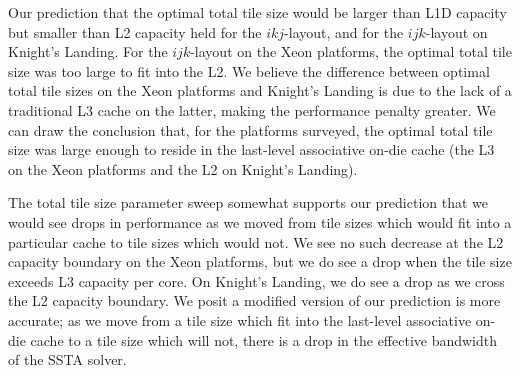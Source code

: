 \documentclass{sig-alternate-05-2015}
\begin{document}
Our prediction that the optimal total tile size would be larger than L1D
  capacity but smaller than L2 capacity held for the \(ikj\)-layout, and for 
  the \(ijk\)-layout on Knight's Landing.
For the \(ijk\)-layout on the Xeon platforms, the optimal total tile size was
  too large to fit into the L2.
We believe the difference between optimal total tile sizes on the Xeon
  platforms and Knight's Landing is due to the lack of a traditional L3 cache on
  the latter, making the performance penalty greater.
We can draw the conclusion that, for the platforms surveyed, the optimal total
  tile size was large enough to reside in the last-level associative on-die cache
  (the L3 on the Xeon platforms and the L2 on Knight's Landing).

The total tile size parameter sweep somewhat supports our prediction that we
  would see drops in performance as we moved from tile sizes which would
  fit into a particular cache to tile sizes which would not.
We see no such decrease at the L2 capacity boundary on the Xeon platforms, but
  we do see a drop when the tile size exceeds L3 capacity per core.
On Knight's Landing, we do see a drop as we cross the L2 capacity boundary.
We posit a modified version of our prediction is more accurate; as we move from
  a tile size which fit into the last-level associative on-die cache to a tile
  size which will not, there is a drop in the effective bandwidth of the SSTA
  solver.

\end{document}
